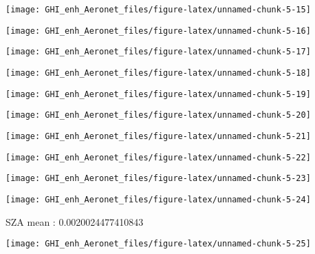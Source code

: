 \documentclass[
  10pt,
  a4paper,oneside]{article}
\begin{document}
\begin{center}\texttt{[image: GHI\_enh\_Aeronet\_files/figure-latex/unnamed-chunk-5-15]} \end{center}

\begin{center}\texttt{[image: GHI\_enh\_Aeronet\_files/figure-latex/unnamed-chunk-5-16]} \end{center}

\begin{center}\texttt{[image: GHI\_enh\_Aeronet\_files/figure-latex/unnamed-chunk-5-17]} \end{center}

\begin{center}\texttt{[image: GHI\_enh\_Aeronet\_files/figure-latex/unnamed-chunk-5-18]} \end{center}

\begin{center}\texttt{[image: GHI\_enh\_Aeronet\_files/figure-latex/unnamed-chunk-5-19]} \end{center}

\begin{center}\texttt{[image: GHI\_enh\_Aeronet\_files/figure-latex/unnamed-chunk-5-20]} \end{center}

\begin{center}\texttt{[image: GHI\_enh\_Aeronet\_files/figure-latex/unnamed-chunk-5-21]} \end{center}

\begin{center}\texttt{[image: GHI\_enh\_Aeronet\_files/figure-latex/unnamed-chunk-5-22]} \end{center}

\begin{center}\texttt{[image: GHI\_enh\_Aeronet\_files/figure-latex/unnamed-chunk-5-23]} \end{center}

\begin{center}\texttt{[image: GHI\_enh\_Aeronet\_files/figure-latex/unnamed-chunk-5-24]} \end{center}

SZA mean : 0.0020024477410843

\begin{center}\texttt{[image: GHI\_enh\_Aeronet\_files/figure-latex/unnamed-chunk-5-25]} \end{center}
\end{document}
